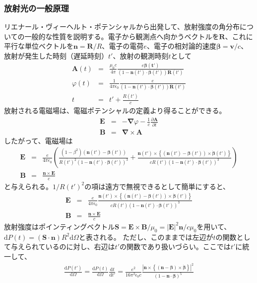 \documentclass[a4paper,11pt,uplatex]{jsbook}
\begin{document}
\subsubsection{放射光の一般原理}\label{sec:general radiation}
リエナール・ヴィーヘルト・ポテンシャルから出発して、放射強度の角分布についての一般的な性質を説明する。電子から観測点へ向かうベクトルを$\bm{R}$、これに平行な単位ベクトルを$\bm{n} = \bm{R}/R$、電子の電荷$e$、電子の相対論的速度$\bm{\beta} = \bm{v}/c$、
放射が発生した時刻（遅延時刻）$t'$、放射の観測時刻$t$として
\begin{eqnarray}
  \bm{A}(t) &=& \frac{\mu_0 c}{4\pi}\frac{e\bm{\beta(t')}}{(1-\bm{n}(t')\cdot\bm{\beta}(t'))\bm{R}(t')}\label{retarded potential}\\
  \varphi(t) &=& \frac{1}{4\pi \epsilon_0}\frac{e}{(1-\bm{n}(t')\cdot\bm{\beta}(t'))\bm{R}(t')}\label{retarded potential phi}\\
  t &=& t' + \frac{R(t')}{c}
\end{eqnarray}
放射される電磁場は、電磁ポテンシャルの定義より得ることができる。
\begin{eqnarray}
  \bm{E} &=& -\bm{\nabla} \varphi - \frac{1}{c}\frac{\partial \bm{A}}{\partial t}\\
  \bm{B} &=& \bm{\nabla} \times \bm{A}
\end{eqnarray}
したがって、電磁場は
\begin{eqnarray}
  \bm{E} &=& \frac{e}{4\pi \epsilon_0}\left( \frac{(1-\beta^2)(\bm{n}(t')-\bm{\beta}(t'))}{R(t')^2(1-\bm{n}(t')\cdot\bm{\beta}(t'))^3}+
  \frac{\bm{n}(t')\times \left\{ (\bm{n}(t')-\bm{\beta}(t'))\times \bm{\dot{\beta}}(t')\right\}}{cR(t')(1-\bm{n}(t')\cdot\bm{\beta}(t'))^3} \right)\\
  \bm{B} &=& \frac{\bm{n}\times\bm{E}}{c}
\end{eqnarray}
と与えられる。$1/R(t')^2$の項は遠方で無視できるとして簡単にすると、
\begin{eqnarray}\label{eq:e field}
  \bm{E} &=& \frac{e}{4\pi \epsilon_0}\frac{\bm{n}(t')\times \left\{ (\bm{n}(t')-\bm{\beta}(t'))\times \bm{\dot{\beta}}(t')\right\}}{cR(t')(1-\bm{n}(t')\cdot\bm{\beta}(t'))^3}\\
  \bm{B} &=& \frac{\bm{n}\times\bm{E}}{c}
\end{eqnarray}
放射強度はポインティングベクトル$\bm{S} =\bm{E}\times \bm{B}/\mu_0 = |\bm{E}|^2\bm{n}/c\mu_0$を用いて、$\text{d}P(t) = (\bm{S}\cdot\bm{n})R^2\text{d}\Omega$と表される。
ただし、このままでは左辺が$t$の関数として与えられているのに対し、右辺は$t'$の関数であり扱いづらい。ここでは$t'$に統一して、
\begin{eqnarray} \label{eq:power}
  \frac{\text{d}P(t')}{\text{d}\Omega} = \frac{\text{d}P(t)}{\text{d}\Omega}\frac{\text{d}t}{\text{d}t'} = \frac{e^2}{16\pi^2 \epsilon_0 c}\frac{\left|\bm{n}\times \left\{ (\bm{n}-\bm{\beta})\times \bm{\dot{\beta}}\right\}\right|^2}{(1-\bm{n}\cdot\bm{\beta})^5}
\end{eqnarray}
\end{document}
